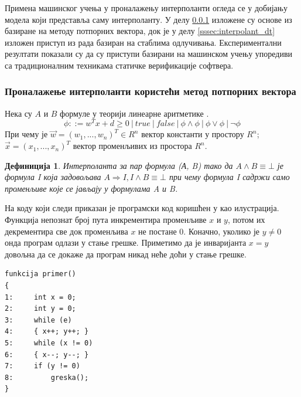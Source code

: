 \documentclass[a4paper]{article}
\newtheorem{definic}{Дефиниција}
\begin{document}
{Примена машинског учења у проналажењу интерполанти огледа се у добијању модела
који представља саму интерполанту. У делу \ref{sssec:interpolant_svm} изложене су основе из \cite{Sharma_interpolantsas} базиране на методу
потпорних вектора, док је у делу \ref{sssec:interpolant_dt} изложен приступ из рада \cite{KrishnaPW15} базиран на стаблима одлучивања. Експериментални резултати
показали су да су приступи базирани на машинском учењу упоредиви са традиционалним техникама статичке верификације софтвера.


\subsubsection{Проналажење интерполанти користећи метод потпорних вектора}
\label{sssec:interpolant_svm}

Нека су $A$ и $B$ формуле у теорији линеарне аритметике \cite{Kroening2008}.
\begin{equation}
\phi ::= w^Tx + d \geq 0 \ | \ true \ | \ false \ | \ \phi \land \phi \ | \ \phi \lor \phi \ | \ \neg \phi
\end{equation}
При чему је $\vec{w} = (w_1, ..., w_n)^T \in R^n$ вектор константи у простору $R^n$; $\vec{x} = (x_1, ..., x_n)^T$
вектор променљивих из простора $R^n$.

\begin{definic}
Интерполанта за пар формула (А, B) тако да $A \land B \equiv \bot$ је формула I која задовољава $A \Rightarrow I, I \land B \equiv \bot$
при чему формула I садржи само променљиве које се јављају у формулама A и B.
\end{definic}

На коду који следи приказан је програмски код коришћен у \cite{Sharma_interpolantsas} као илустрација.
Функција непознат број пута инкрементира променљиве $x$ и $y$, потом их декрементира све док променљива $x$
не постане 0. Коначно, уколико је $y \neq 0$ онда програм одлази у стање грешке.
Приметимо да је инваријанта $x = y$ довољна да се докаже да програм никад неће доћи у стање грешке.

\begin{verbatim}
funkcija primer()
{
1:     int x = 0;
2:     int y = 0;
3:     while (e)
4:     { x++; y++; }
5:     while (x != 0)
6:     { x--; y--; }
7:     if (y != 0)
8:         greska();
}
\end{verbatim}

}
\end{document}
